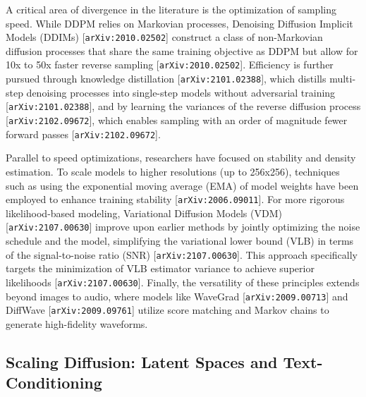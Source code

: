 \documentclass[11pt]{article}
\begin{document}
A critical area of divergence in the literature is the optimization of sampling speed. While DDPM relies on Markovian processes, Denoising Diffusion Implicit Models (DDIMs) [\texttt{arXiv:2010.02502}] construct a class of non-Markovian diffusion processes that share the same training objective as DDPM but allow for 10x to 50x faster reverse sampling [\texttt{arXiv:2010.02502}]. Efficiency is further pursued through knowledge distillation [\texttt{arXiv:2101.02388}], which distills multi-step denoising processes into single-step models without adversarial training [\texttt{arXiv:2101.02388}], and by learning the variances of the reverse diffusion process [\texttt{arXiv:2102.09672}], which enables sampling with an order of magnitude fewer forward passes [\texttt{arXiv:2102.09672}].

Parallel to speed optimizations, researchers have focused on stability and density estimation. To scale models to higher resolutions (up to 256x256), techniques such as using the exponential moving average (EMA) of model weights have been employed to enhance training stability [\texttt{arXiv:2006.09011}]. For more rigorous likelihood-based modeling, Variational Diffusion Models (VDM) [\texttt{arXiv:2107.00630}] improve upon earlier methods by jointly optimizing the noise schedule and the model, simplifying the variational lower bound (VLB) in terms of the signal-to-noise ratio (SNR) [\texttt{arXiv:2107.00630}]. This approach specifically targets the minimization of VLB estimator variance to achieve superior likelihoods [\texttt{arXiv:2107.00630}]. Finally, the versatility of these principles extends beyond images to audio, where models like WaveGrad [\texttt{arXiv:2009.00713}] and DiffWave [\texttt{arXiv:2009.09761}] utilize score matching and Markov chains to generate high-fidelity waveforms.

\subsection{Scaling Diffusion: Latent Spaces and Text-Conditioning}
\end{document}
